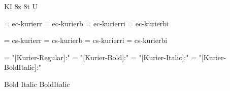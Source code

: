 
\ifx\ffdecl\undefined  \fi

\ffdecl [Kurier] {\caps \cond \lightw \heavyw} {\rm \bf \it \bi} {} {KI} {8z 8t U}

\def\caps{\ffsetV{caps}{-sc}\ffsetX}  \def\nocaps{\ffsetV{caps}{}\ffsetX}
\def\cond{\ffsetV{cond}{c}\ffsetX}    \def\nocond{\ffsetV{cond}{}\ffsetX}
\def\capsV{} 
\def\condV{} 
\def\lightw{\ffvars{l}{m}{li}{mi}\ffsetX}
\def\heavyw{\ffvars{h}{!}{hi}{!}\ffsetX}
\def\normalw{\ffvars {r}{b}{ri}{bi}\ffsetX}

\ismacro{}\ifttrue

   \font\tenrm = ec-kurierr  \sizespec
   \font\tenbf = ec-kurierb  \sizespec
   \font\tenit = ec-kurierri \sizespec
   \font\tenbi = ec-kurierbi \sizespec

   \def\ffnamegen{ec-kurier\condV\ffvarV\capsV}

\fi

\ismacro{}\iftrue

   \font\tenrm = cs-kurierr  \sizespec
   \font\tenbf = cs-kurierb  \sizespec
   \font\tenit = cs-kurierri \sizespec
   \font\tenbi = cs-kurierbi \sizespec

   \def\ffnamegen{cs-kurier\condV\ffvarV\capsV}
   

\fi

\ismacro{}\iftrue

   \font\tenrm = "[Kurier-Regular]:\fontfeatures"    \sizespec
   \font\tenbf = "[Kurier-Bold]:\fontfeatures"       \sizespec
   \font\tenit = "[Kurier-Italic]:\fontfeatures"     \sizespec
   \font\tenbi = "[Kurier-BoldItalic]:\fontfeatures" \sizespec

   \def\ffnamegen{"[Kurier\condV\ffvarxV-\ffvarV]:\capsV\fontfeatures"} 

    {Bold} {Italic} {BoldItalic}
   \def\caps{\ffsetV{caps}{+smcp;}\ffsetX}
   \def\cond{\ffsetV{cond}{Cond}\ffsetX}
   \def\lightw{\ffvarsx{Light}{Medium}{Light}{Medium}%
      \ffvars{Regular}{Regular}{Italic}{Italic}\ffsetX}
   \def\heavyw{\ffvarsx{Heavy}{}{Heavy}{}\ffvars{Regular}{!}{Italic}{!}\ffsetX}
   \def\normalw{\ffvarsx{}{}{}{}\ffvars{Regular}{Bold}{Italic}{BoldItalic}\ffsetX}

   \tryprotected\def\ffvarsx#1#2#3#4{%
      \def\ffvarxY##1{\ifcase##1 #1\or#2\or#3\or#4\fi}%
   }
   \def\ffsetR#1{\edef\ffvarxV{\ffvarxY{#1}}}
   \ffvarsx {}{}{}{}

\fi
\tenrm %

\def\narrow{\cond\fam}

\ifx\loadmathfonts\relax \endinput \fi
\def\mfamname{kurier}
\ifx\mathpreloaded R \normalmath \else  \fi                     

